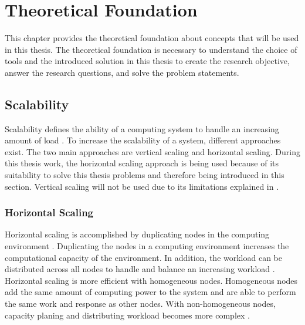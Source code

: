 \chapter{Theoretical Foundation}
\label{chap:02_foundation}


This chapter provides the theoretical foundation about concepts that will be used in this thesis. The theoretical foundation is necessary to understand the choice of tools and the introduced solution in this thesis to create the research objective, answer the research questions, and solve the problem statements.


\section{Scalability}
\label{sec:02_foundations_scalability}
Scalability defines the ability of a computing system to handle an increasing amount of load \cite{Farcic2017Toolkit21}. 
To increase the scalability of a system, different approaches exist. The two main approaches are vertical scaling and horizontal scaling.
During this thesis work, the horizontal scaling approach is being used because of its suitability to solve this thesis problems and therefore being introduced in this section.
Vertical scaling will not be used due to its limitations explained in .


\subsection{Horizontal Scaling}
Horizontal scaling is accomplished by duplicating nodes in the computing environment \cite{Wilder2012CloudPatterns}.
Duplicating the nodes in a computing environment increases the computational capacity of the environment. In addition, the workload can be distributed across all nodes to handle and balance an increasing workload \cite{Wilder2012CloudPatterns, Abbott2015ScalabilityArt}. 
Horizontal scaling is more efficient with homogeneous nodes. Homogeneous nodes add the same amount of computing power to the system and are able to perform the same work and response as other nodes. With non-homogeneous nodes, capacity planing and distributing workload becomes more complex \cite{Abbott2015ScalabilityArt}.


